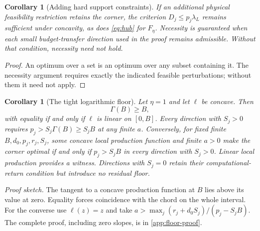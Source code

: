 \documentclass[11pt,a4paper]{article}
\newtheorem{corollary}[proposition]{Corollary}
\newtheorem{productioncorollary}{Corollary}[proposition]
\theoremstyle{definition}\newtheorem{definition}{Definition}
\begin{document}
\begin{corollary}[Adding hard support constraints]
\label{cor:feasibility}
If an additional physical feasibility restriction retains the corner,
the criterion $D_j\leq p_j\lambda_L$ remains sufficient under
concavity, as does \cref{eq:hub} for $F_\eta$. Necessity is guaranteed
when each small budget-transfer direction used in the proof remains
admissible. Without that condition, necessity need not hold.
\end{corollary}
\begin{proof}
An optimum over a set is an optimum over any subset containing it.
The necessity argument requires exactly the indicated feasible
perturbations; without them it need not apply.
\end{proof}

\begin{productioncorollary}[The tight logarithmic floor]
\label{cor:production-growth}
Let $\eta=1$ and let $\ell$ be concave. Then
\begin{equation}
 \Gamma(B)\geq B,
 \label{eq:tight-floor}
\end{equation}
with equality if and only if $\ell$ is linear on $[0,B]$.
Every direction with $S_j>0$ requires
$p_j>S_j\Gamma(B)\geq S_jB$ at any finite $a$.
Conversely, for fixed finite $B,d_0,p_j,r_j,S_j$, some concave local
production function and finite $a>0$ make the corner optimal if and
only if $p_j>S_jB$ in every direction with $S_j>0$.
Linear local production provides a witness. Directions with $S_j=0$
retain their computational-return condition but introduce no residual
floor.
\end{productioncorollary}
\noindent\emph{Proof sketch.}
The tangent to a concave production function at $B$ lies above its
value at zero. Equality forces coincidence with the chord on the whole
interval. For the converse use $\ell(z)=z$ and take
$a>\max_j(r_j+d_0S_j)/(p_j-S_jB)$.
The complete proof, including zero slopes, is in \cref{app:floor-proof}.
\end{document}
